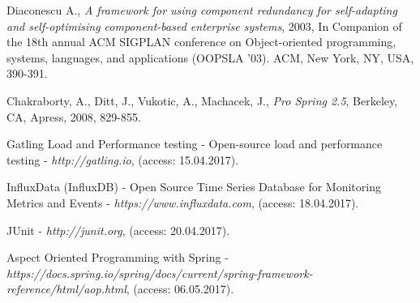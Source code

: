\documentclass[10pt,a4paper]{article}
\begin{document}
\begin{thebibliography}{9}
Diaconescu A., \textit{A framework for using component redundancy for self-adapting and self-optimising component-based enterprise systems}, 2003, In Companion of the 18th annual ACM SIGPLAN conference on Object-oriented programming, systems, languages, and applications (OOPSLA '03). ACM, New York, NY, USA, 390-391. 

Chakraborty, A., Ditt, J., Vukotic, A., Machacek, J., \textit{Pro Spring 2.5}, Berkeley, CA, Apress, 2008, 829-855.  

Gatling Load and Performance testing - Open-source load and performance testing - \textit{http://gatling.io}, (access: 15.04.2017).

InfluxData (InfluxDB) - Open Source Time Series Database for Monitoring Metrics and Events - \textit{https://www.influxdata.com}, (access: 18.04.2017).


JUnit - \textit{http://junit.org}, (access: 20.04.2017).

Aspect Oriented Programming with Spring - \\
\textit{https://docs.spring.io/spring/docs/current/spring-framework-reference/html/aop.html}, (access: 06.05.2017).


\end{thebibliography}
\end{document}
